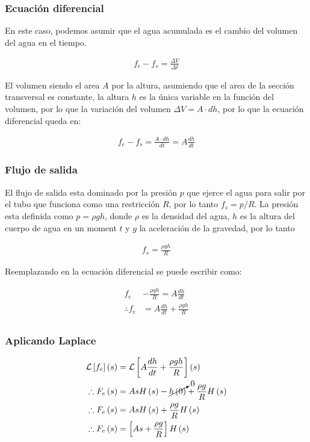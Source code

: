 \documentclass{article}
\begin{document}
\subsubsection*{Ecuación diferencial}

En este caso, podemos asumir que el agua acumulada es el cambio del volumen del agua en el tiempo.

\begin{align*}
    f_e - f_s = \frac{\Delta V}{\Delta t}
\end{align*}

El volumen siendo el area $A$ por la altura, asumiendo que el area de la sección transversal es constante, la altura $h$ es la única variable en la función del volumen, por lo que la variación del volumen $\Delta V = A \cdot d h$, por lo que la ecuación diferencial queda en:

\begin{align*}
    f_e - f_s = \frac{A \cdot d h}{d t} = A \frac{d h}{d t}
\end{align*}

\subsubsection*{Flujo de salida}

El flujo de salida esta dominado por la presión $p$ que ejerce el agua para salir por el tubo que funciona como una restricción $R$, por lo tanto $f_s = p/R$. La presión esta definida como $p = \rho gh$, donde $\rho$ es la densidad del agua, $h$ es la altura del cuerpo de agua en un moment $t$ y $g$ la aceleración de la gravedad, por lo tanto

\begin{align*}
    f_s = \frac{\rho gh}{R}
\end{align*}

Reemplazando en la ecuación diferencial se puede escribir como:

\begin{align*}
    f_e &- \frac{\rho gh}{R} = A \frac{dh}{dt}\\
    \therefore f_e &= A \frac{dh}{dt} + \frac{\rho gh}{R}\\
\end{align*}

\subsubsection*{Aplicando Laplace}

\begin{align*}
    \mathcal{L}\left[f_e\right]\left(s\right) &= \mathcal{L}\left[A \frac{dh}{dt} + \frac{\rho gh}{R}\right]\left(s\right) \\
    \therefore F_e\left(s\right) &= AsH\left(s\right) - \cancelto{0}{h\left(0\right)} + \frac{\rho g}{R}H\left(s\right) \\
    \therefore F_e\left(s\right) &= AsH\left(s\right) + \frac{\rho g}{R}H\left(s\right) \\
    \therefore \label{eq:3} F_e\left(s\right) &= \left[As + \frac{\rho g}{R}\right]H\left(s\right)
\end{align*}
\end{document}
